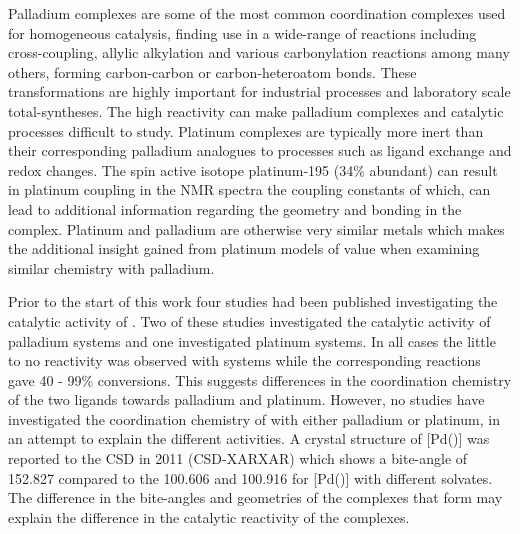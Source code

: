 Palladium complexes are some of the most common coordination complexes used for homogeneous catalysis, finding use in a wide-range of reactions including cross-coupling, allylic alkylation and various carbonylation reactions among many others, forming carbon-carbon or carbon-heteroatom bonds.\cite{Dierkes1998, Freixa2003, Nicolaou2005, Peris2004, Shen2008, Suzuki1999, Wu2013}  These transformations are highly important for industrial processes and laboratory scale total-syntheses.\cite{Simeone2010, Trost2012, Wagaw1999}  The high reactivity can make palladium complexes and catalytic processes difficult to study. Platinum complexes are typically more inert than their corresponding palladium analogues to processes such as ligand exchange and redox changes.\cite{Chianese2007}  The spin active isotope platinum-195 (34\% abundant) can result in platinum coupling in the NMR spectra the coupling constants of which, can lead to additional information regarding the geometry and bonding in the complex.  Platinum and palladium are otherwise very similar metals which makes the additional insight gained from platinum models of value when examining similar chemistry with palladium.  

Prior to the start of this work four studies had been published investigating the catalytic activity of \tBuxantphos{}.\cite{Mispelaere2005, Dongol2007, Ohshima2009, Cabello2007}  Two of these studies investigated the catalytic activity of \tBuxantphos{} palladium systems and one investigated platinum systems.  In all cases the little to no reactivity was observed with \tBuxantphos{} systems while the corresponding \Phxantphos{} reactions gave 40 - 99\% conversions.  This suggests differences in the coordination chemistry of the two ligands towards palladium and platinum.  However, no studies have investigated the coordination chemistry of \tBuxantphos{} with either palladium or platinum, in an attempt to explain the different activities.  A crystal structure of [Pd(\tBuxantphos)] was reported to the \gls{CSD} in 2011 (CSD-XARXAR) which shows a bite-angle of 152.827\degrees{} compared to the 100.606 and 100.916\degrees{} for [Pd(\Phxantphos)] with different solvates.\cite{Allen2002,  Johns2006, Jahromi2012} The difference in the bite-angles and geometries of the complexes that form may explain the difference in the catalytic reactivity of the complexes.  

